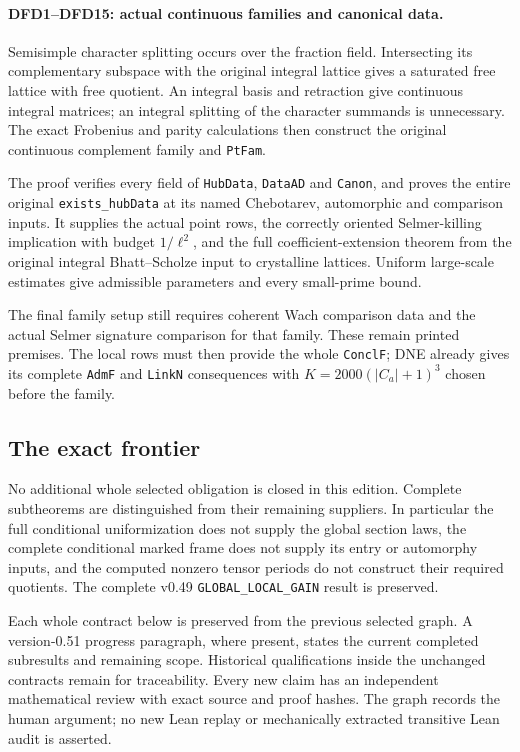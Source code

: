 \documentclass[11pt,a4paper]{article}
\numberwithin{equation}{section}
\theoremstyle{remark}\newtheorem{remark}[theorem]{Remark}
\begin{document}
\paragraph{DFD1--DFD15: actual continuous families and canonical data.}
Semisimple character splitting occurs over the fraction field.
Intersecting its complementary subspace with the original integral
lattice gives a saturated free lattice with free quotient.
An integral basis and retraction give continuous integral matrices;
an integral splitting of the character summands is unnecessary.
The exact Frobenius and parity calculations then construct the
original continuous complement family and \texttt{Pt\allowbreak Fam}.

The proof verifies every field of \texttt{Hub\allowbreak Data}, \texttt{Data\allowbreak AD}
and \texttt{Canon}, and proves the entire original
\texttt{exists\_\allowbreak hub\allowbreak Data} at its named Chebotarev, automorphic and
comparison inputs. It supplies the actual point rows, the correctly
oriented Selmer-killing implication with budget $1/\ell^2$, and
the full coefficient-extension theorem from the original integral
Bhatt--Scholze input to crystalline lattices. Uniform large-scale
estimates give admissible parameters and every small-prime bound.

The final family setup still requires coherent Wach comparison
data and the actual Selmer signature comparison for that family.
These remain printed premises. The local rows must then provide
the whole \texttt{Concl\allowbreak F}; DNE already gives its complete
\texttt{Adm\allowbreak F} and \texttt{Link\allowbreak N} consequences with
$K=2000(|C_a|+1)^3$ chosen before the family.

\subsection{The exact frontier}

No additional whole selected obligation is closed in this edition.
Complete subtheorems are distinguished from their remaining
suppliers. In particular the full conditional uniformization does
not supply the global section laws, the complete conditional
marked frame does not supply its entry or automorphy inputs,
and the computed nonzero tensor periods do not construct their
required quotients. The complete v0.49
\texttt{GLOBAL\_\allowbreak LOCAL\_\allowbreak GAIN} result is preserved.

Each whole contract below is preserved from the previous selected
graph. A version-0.51 progress paragraph, where present, states
the current completed subresults and remaining scope. Historical
qualifications inside the unchanged contracts remain for
traceability. Every new claim has an independent mathematical
review with exact source and proof hashes. The graph records
the human argument; no new Lean replay or mechanically extracted
transitive Lean audit is asserted.
\end{document}
